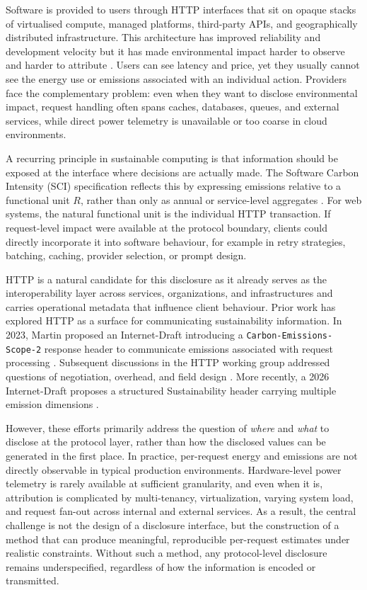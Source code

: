 Software is provided to users through HTTP interfaces that sit on opaque stacks of virtualised compute, managed platforms, third-party APIs, and geographically distributed infrastructure. This architecture has improved reliability and development velocity but it has made environmental impact harder to observe and harder to attribute \cite{parssinen2018onlineadvertising,han2025fairco2}. Users can see latency and price, yet they usually cannot see the energy use or emissions associated with an individual action. Providers face the complementary problem: even when they want to disclose environmental impact, request handling often spans caches, databases, queues, and external services, while direct power telemetry is unavailable or too coarse in cloud environments.

A recurring principle in sustainable computing is that information should be exposed at the interface where decisions are actually made. The Software Carbon Intensity (SCI) specification reflects this by expressing emissions relative to a functional unit \(R\), rather than only as annual or service-level aggregates \cite{gsf-sci}. For web systems, the natural functional unit is the individual HTTP transaction. If request-level impact were available at the protocol boundary, clients could directly incorporate it into software behaviour, for example in retry strategies, batching, caching, provider selection, or prompt design.

HTTP is a natural candidate for this disclosure as it already serves as the interoperability layer across services, organizations, and infrastructures and carries operational metadata that influence client behaviour. Prior work has explored HTTP as a surface for communicating sustainability information. In 2023, Martin proposed an Internet-Draft introducing a \texttt{Carbon-Emissions-Scope-2} response header to communicate emissions associated with request processing \cite{martin-http-carbon-emissions-scope-2-00}. Subsequent discussions in the HTTP working group addressed questions of negotiation, overhead, and field design \cite{httpwg-admin-issue-52-carbon-emissions,ietf-http-wg-mailinglist-carbon-header-thread}. More recently, a 2026 Internet-Draft proposes a structured Sustainability header carrying multiple emission dimensions \cite{besleaga-green-sustainability-header-00}.

However, these efforts primarily address the question of \emph{where} and \emph{what} to disclose at the protocol layer, rather than how the disclosed values can be generated in the first place. In practice, per-request energy and emissions are not directly observable in typical production environments. Hardware-level power telemetry is rarely available at sufficient granularity, and even when it is, attribution is complicated by multi-tenancy, virtualization, varying system load, and request fan-out across internal and external services. As a result, the central challenge is not the design of a disclosure interface, but the construction of a method that can produce meaningful, reproducible per-request estimates under realistic constraints. Without such a method, any protocol-level disclosure remains underspecified, regardless of how the information is encoded or transmitted.

